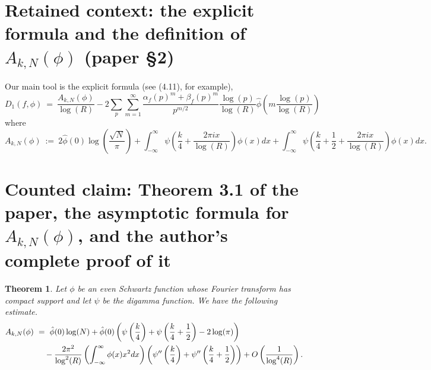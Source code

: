 \documentclass[10pt,a4paper]{amsart}
\newtheorem{theorem}{Theorem}
\begin{document}
\section*{Retained context: the explicit formula and the definition of $A_{k,N}(\phi)$ (paper \S2)}
Our main tool is the explicit formula (see \cite{ILS2} (4.11), for example), \begin{equation}\label{eq:1lvl density breakdown}
    D_1(f, \phi) \ = \ \frac{A_{k,N}(\phi)}{\log(R)} - 2\sum_{p}\sum_{m=1}^\infty \frac{\alpha_f(p)^{m}+\beta_f(p)^{m}}{p^{m/2}} \frac{\log(p)}{\log(R) } \hat\phi\left(m \frac{\log(p)}{\log(R) }\right)
\end{equation} where 
    $$A_{k,N} (\phi)\ :=\  2\hat\phi(0)\log\left(\frac{\sqrt{N}}{\pi} \right) + \int_{-\infty}^\infty \psi\left(\frac{k}{4}+ \frac{2\pi i x}{\log(R) }\right)\phi(x)dx + \int_{-\infty}^\infty \psi\left(\frac{k}{4}+ \frac{1}{2} +\frac{2\pi i x}{\log(R)}\right)\phi(x)dx . $$

\section*{Counted claim: Theorem 3.1 of the paper, the asymptotic formula for $A_{k,N}(\phi)$, and the author's complete proof of it}
\begin{theorem}\label{gammaf}  Let $\phi$ be an even Schwartz function whose Fourier transform has compact support and let $\psi$ be the digamma function. We have the following estimate.
    \begin{align}
A_{k,N} (\phi)& \ = \ \hat\phi(0)\log(N) +\hat\phi(0)  \left(\psi\left(\frac{k}{4}\right)+\psi\left(\frac{k}{4}+ \frac{1}{2}\right)-2\log(\pi)\right) \notag \\ &~~~~- \frac{2\pi^2}{\log^2(R)}\left(\int_{-\infty}^\infty \phi(x)x^2 dx\right)\left(\psi''\left(\frac{k}{4}\right)+\psi''\left(\frac{k}{4}+ \frac{1}{2}\right)\right) +O\left(\frac{1}{\log^4(R)}\right).
\end{align} 
\end{theorem}
\end{document}
